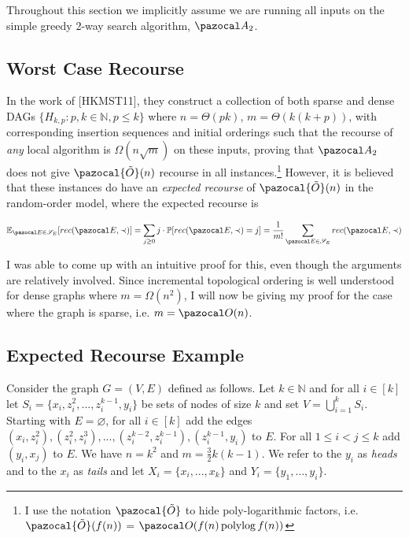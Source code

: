 \documentclass{report}
\DeclareMathOperator*{\polylog}{polylog}
\begin{document}
Throughout this section we implicitly assume we are running all inputs on the simple greedy 2-way search algorithm, $\pazocal A_2$.

\subsection{Worst Case Recourse}

In the work of [HKMST11], they construct a collection of both sparse and dense DAGs $\{ H_{k,p} : p,k \in \mathbb N, p \leq k \}$ where $n = \Theta(pk)$, $m=\Theta (k(k+p))$, with corresponding insertion sequences and initial orderings such that the recourse of \textit{any} local algorithm is $\Omega(n\sqrt{m})$ on these inputs, proving that $\pazocal A_2$ does not give $\pazocal{\tilde{O}}(n)$ recourse in all instances.\footnote{I use the notation $\pazocal{\tilde{O}}$ to hide poly-logarithmic factors, i.e. $\pazocal{\tilde{O}}(f(n))$ = $\pazocal O (f(n) \polylog f(n))$} However, it is believed that these instances do have an \textit{expected recourse} of $\pazocal{\tilde{O}}(n)$ in the random-order model, where the expected recourse is

\[ \mathbb{E}_{\pazocal E \in \mathcal{S}_{E}}[rec(\pazocal E, \prec)] = \sum_{j \geq 0} j \cdot \mathbb{P}[rec(\pazocal E, \prec)=j] = \frac{1}{m!} \sum_{\pazocal E \in \mathcal S_E}rec(\pazocal E, \prec) \]

I was able to come up with an intuitive proof for this, even though the arguments are relatively involved. Since incremental topological ordering is well understood for dense graphs where $m = \Omega (n^2)$, I will now be giving my proof for the case where the graph is sparse, i.e. $m = \pazocal O (n)$.  

\subsection{Expected Recourse Example}

Consider the graph $G=(V,E)$ defined as follows. Let $k \in \mathbb{N}$ and for all $i \in [k]$ let $S_{i} = \{ x_{i}, z_{i}^{2}, ..., z_{i}^{k-1}, y_{i} \}$ be sets of nodes of size $k$ and set $V = \bigcup_{i=1}^{k}S_{i}$. Starting with $E= \varnothing$, for all $i \in [k]$ add the edges $(x_{i}, z_{i}^{2}), (z_{i}^{2}, z_{i}^{3}), ..., (z_{i}^{k-2}, z_{i}^{k-1}), (z_{i}^{k-1}, y_{i})$ to $E$. For all $1 \leq i < j \leq k$ add $(y_i,x_j)$ to $E$. We have $n=k^2$ and $m=\frac{3}{2}k(k-1)$. We refer to the $y_{i}$ as \textit{heads} and to the $x_{i}$ as \textit{tails} and let $X_i=\{x_i,...,x_k\}$ and $Y_i=\{y_1,...,y_i\}$.
\end{document}
